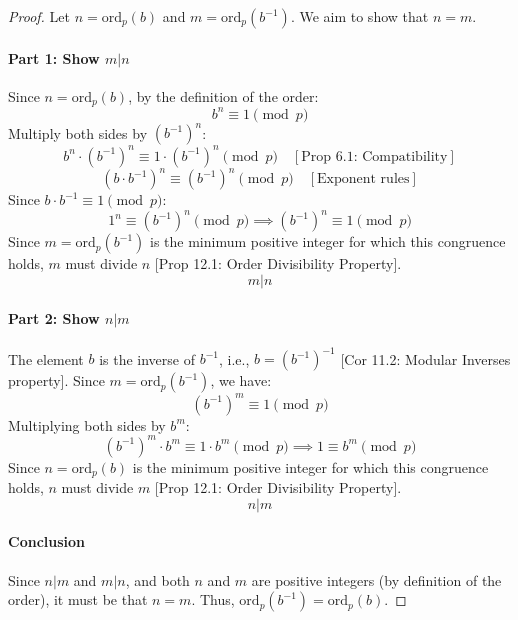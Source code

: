 \begin{proof}
Let $n = \mathrm{ord}_{p}(b)$ and $m = \mathrm{ord}_{p}(b^{-1})$. We aim to show that $n=m$.

\paragraph{Part 1: Show $m|n$}
Since $n = \mathrm{ord}_{p}(b)$, by the definition of the order:
$$ b^n \equiv 1 \pmod{p} $$
Multiply both sides by $(b^{-1})^n$:
$$ b^n \cdot (b^{-1})^n \equiv 1 \cdot (b^{-1})^n \pmod{p} \quad [\text{Prop 6.1: Compatibility}] $$
$$ (b \cdot b^{-1})^n \equiv (b^{-1})^n \pmod{p} \quad [\text{Exponent rules}] $$
Since $b \cdot b^{-1} \equiv 1 \pmod{p}$:
$$ 1^n \equiv (b^{-1})^n \pmod{p} \implies (b^{-1})^n \equiv 1 \pmod{p} $$
Since $m = \mathrm{ord}_{p}(b^{-1})$ is the minimum positive integer for which this congruence holds, $m$ must divide $n$ [Prop 12.1: Order Divisibility Property].
$$ m|n $$

\paragraph{Part 2: Show $n|m$}
The element $b$ is the inverse of $b^{-1}$, i.e., $b = (b^{-1})^{-1}$ [Cor 11.2: Modular Inverses property].
Since $m = \mathrm{ord}_{p}(b^{-1})$, we have:
$$ (b^{-1})^m \equiv 1 \pmod{p} $$
Multiplying both sides by $b^m$:
$$ (b^{-1})^m \cdot b^m \equiv 1 \cdot b^m \pmod{p} \implies 1 \equiv b^m \pmod{p} $$
Since $n = \mathrm{ord}_{p}(b)$ is the minimum positive integer for which this congruence holds, $n$ must divide $m$ [Prop 12.1: Order Divisibility Property].
$$ n|m $$

\paragraph{Conclusion}
Since $n|m$ and $m|n$, and both $n$ and $m$ are positive integers (by definition of the order), it must be that $n=m$.
Thus, $\mathrm{ord}_{p}(b^{-1}) = \mathrm{ord}_{p}(b)$.
\end{proof}